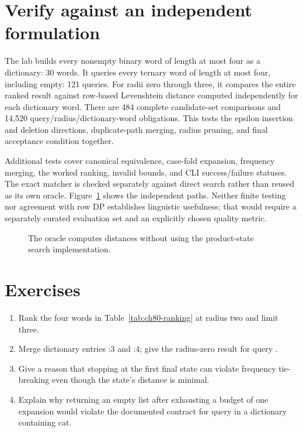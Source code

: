 \section{Verify against an independent formulation}
\label{sec:ch80-tests}
The lab builds every nonempty binary word of length at most four as a dictionary: 30 words.
It queries every ternary word of length at most four, including empty: 121 queries.
For radii zero through three, it compares the entire ranked result against row-based Levenshtein distance computed independently for each dictionary word.
There are 484 complete candidate-set comparisons and 14,520 query/radius/dictionary-word obligations.
This tests the epsilon insertion and deletion directions, duplicate-path merging, radius pruning, and final acceptance condition together.

Additional tests cover canonical equivalence, case-fold expansion, frequency merging, the worked ranking, invalid bounds, and CLI success/failure statuses.
The exact matcher is checked separately against direct search rather than reused as its own oracle.
Figure~\ref{fig:ch80-oracle} shows the independent paths.
Neither finite testing nor agreement with row DP establishes linguistic usefulness; that would require a separately curated evaluation set and an explicitly chosen quality metric.

\begin{figure}[htbp]
\centering
{}
\caption{The oracle computes distances without using the product-state search implementation.}
\label{fig:ch80-oracle}
\end{figure}

\section{Exercises}
\label{sec:ch80-exercises}
\begin{enumerate}
\item\label{ex:ch80-ranking} Rank the four words in Table~\ref{tab:ch80-ranking} at radius two and limit three.
\item\label{ex:ch80-collision} Merge dictionary entries :3 and :4; give the radius-zero result for query .
\item\label{ex:ch80-stop} Give a reason that stopping at the first final state can violate frequency tie-breaking even though the state's distance is minimal.
\item\label{ex:ch80-incomplete} Explain why returning an empty list after exhausting a budget of one expansion would violate the documented contract for query  in a dictionary containing cat.
\end{enumerate}

